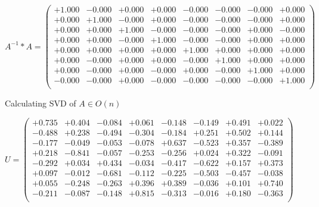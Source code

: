 \documentclass[9pt]{article}
\theoremstyle{plain}
\theoremstyle{definition}
\theoremstyle{remark}
\numberwithin{equation}{section}
\begin{document}
$A^{-1} *A = \left(
\begin{array}{
cccccccc}
+1.000 & -0.000 & +0.000 & +0.000 & -0.000 & -0.000 & -0.000 & +0.000 \\
+0.000 & +1.000 & -0.000 & +0.000 & -0.000 & -0.000 & -0.000 & +0.000 \\
+0.000 & +0.000 & +1.000 & -0.000 & -0.000 & -0.000 & +0.000 & -0.000 \\
+0.000 & +0.000 & -0.000 & +1.000 & -0.000 & -0.000 & +0.000 & +0.000 \\
+0.000 & +0.000 & +0.000 & +0.000 & +1.000 & +0.000 & +0.000 & +0.000 \\
+0.000 & -0.000 & +0.000 & +0.000 & -0.000 & +1.000 & +0.000 & +0.000 \\
+0.000 & -0.000 & +0.000 & -0.000 & +0.000 & -0.000 & +1.000 & +0.000 \\
-0.000 & -0.000 & +0.000 & -0.000 & -0.000 & -0.000 & -0.000 & +1.000 \\
\end{array}
\right)$ \newline 

Calculating SVD of  $A \in O(n)$

$U = \left(
\begin{array}{
cccccccc}
+0.735 & +0.404 & -0.084 & +0.061 & -0.148 & -0.149 & +0.491 & +0.022 \\
-0.488 & +0.238 & -0.494 & -0.304 & -0.184 & +0.251 & +0.502 & +0.144 \\
-0.177 & -0.049 & -0.053 & -0.078 & +0.637 & -0.523 & +0.357 & -0.389 \\
+0.218 & -0.841 & -0.057 & -0.253 & -0.256 & +0.024 & +0.322 & -0.091 \\
-0.292 & +0.034 & +0.434 & -0.034 & -0.417 & -0.622 & +0.157 & +0.373 \\
+0.097 & -0.012 & -0.681 & -0.112 & -0.225 & -0.503 & -0.457 & -0.038 \\
+0.055 & -0.248 & -0.263 & +0.396 & +0.389 & -0.036 & +0.101 & +0.740 \\
-0.211 & -0.087 & -0.148 & +0.815 & -0.313 & -0.016 & +0.180 & -0.363 \\
\end{array}
\right)$ \newline 
\end{document}
